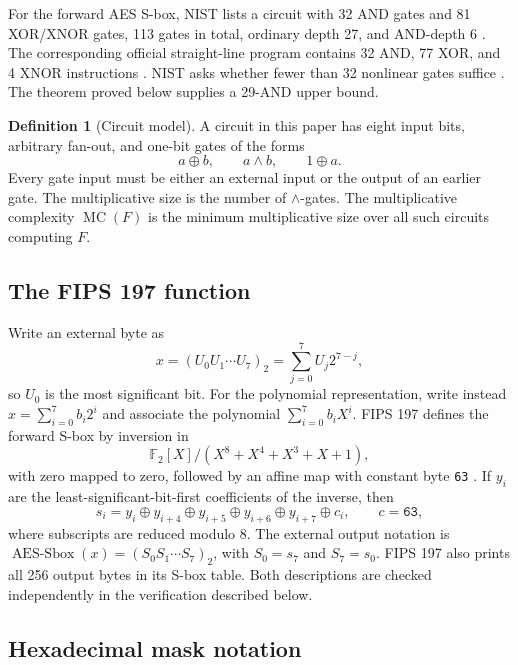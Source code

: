 \documentclass[11pt]{article}
\theoremstyle{definition}
\newtheorem{definition}[definition]{Definition}
\newcommand{\F}{\mathbb F}
\newcommand{\AES}{\operatorname{AES\mbox{-}Sbox}}
\newcommand{\MC}{\operatorname{MC}}
\begin{document}
For the forward AES S-box, NIST lists a circuit with 32 AND gates and 81 XOR/XNOR gates, 113 gates in
total, ordinary depth 27, and AND-depth 6 \cite{nistCircuitList}.  The corresponding official
straight-line program contains 32 AND, 77 XOR, and 4 XNOR instructions
\cite{nistAES32SLP}.  NIST asks whether fewer than 32 nonlinear gates suffice
\cite{nistCircuitComplexity}.  The theorem proved below supplies a 29-AND upper bound.

\begin{definition}[Circuit model]
\label{def:circuit-model}
A circuit in this paper has eight input bits, arbitrary fan-out, and one-bit gates of the forms
\[
 a\oplus b,\qquad a\wedge b,\qquad 1\oplus a.
\]
Every gate input must be either an external input or the output of an earlier gate.  The
multiplicative size is the number of \(\wedge\)-gates.  The multiplicative complexity
\(\MC(F)\) is the minimum multiplicative size over all such circuits computing \(F\).
\end{definition}

\subsection{The FIPS 197 function}

Write an external byte as
\[
  x=(U_0U_1\cdots U_7)_2=\sum_{j=0}^{7}U_j2^{7-j},
\]
so \(U_0\) is the most significant bit.  For the polynomial representation, write instead
\(x=\sum_{i=0}^{7}b_i2^i\) and associate the polynomial
\(\sum_{i=0}^{7}b_iX^i\).  FIPS 197 defines the forward S-box by inversion in
\begin{equation}
 \F_2[X]/(X^8+X^4+X^3+X+1),
 \label{eq:aes-field}
\end{equation}
with zero mapped to zero, followed by an affine map with constant byte \texttt{63}
\cite{fips197}.  If \(y_i\) are the least-significant-bit-first coefficients of the inverse, then
\begin{equation}
 s_i=y_i\oplus y_{i+4}\oplus y_{i+5}\oplus y_{i+6}\oplus y_{i+7}\oplus c_i,
 \qquad c=\texttt{63},
 \label{eq:fips-affine}
\end{equation}
where subscripts are reduced modulo 8.  The external output notation is
\(\AES(x)=(S_0S_1\cdots S_7)_2\), with \(S_0=s_7\) and \(S_7=s_0\).
FIPS 197 also prints all 256 output bytes in its S-box table.  Both descriptions are checked
independently in the verification described below.

\subsection{Hexadecimal mask notation}
\end{document}
